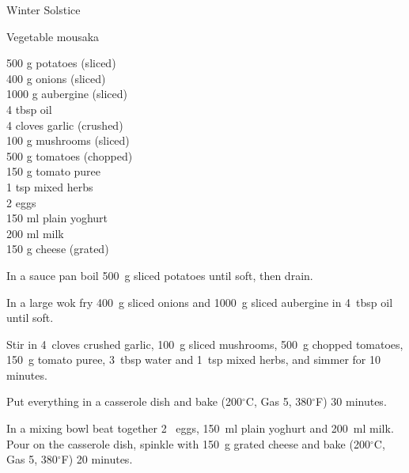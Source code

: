 \begin{menu}{Winter Solstice}
    \begin{recipe}{2}{Vegetable mousaka}%
    
		\begin{ingredients}
		500 g potatoes (sliced) \\
	400 g onions (sliced) \\
	1000 g aubergine (sliced) \\
	4 tbsp oil  \\
	4 cloves garlic (crushed) \\
	100 g mushrooms (sliced) \\
	500 g tomatoes (chopped) \\
	150 g tomato puree  \\
	1 tsp mixed herbs  \\
	2  eggs  \\
	150 ml plain yoghurt  \\
	200 ml milk  \\
	150 g cheese (grated) \\
	
		\end{ingredients}
	
    \begin{instructions}
    \item 
        In a sauce pan boil
        500~g sliced potatoes
        until soft,
        then drain.
      \item 
        In a large wok fry
        400~g sliced onions
        and
        1000~g sliced aubergine
        in
        4~tbsp  oil
        until soft.
      \item 
        Stir in
        4~cloves crushed garlic,
        100~g sliced mushrooms,
        500~g chopped tomatoes,
        150~g  tomato puree,
        3~tbsp  water
        and
        1~tsp  mixed herbs,
        and simmer for 10 minutes.
      \item 
        Put everything in a casserole dish
        and bake 
      (200$^{\circ}$C, Gas 5, 380$^{\circ}$F)
     30 minutes.
      \item 
        In a mixing bowl beat together
        2~  eggs,
        150~ml  plain yoghurt
        and
        200~ml  milk.
        Pour on the casserole dish, spinkle with
        150~g grated cheese
        and bake 
      (200$^{\circ}$C, Gas 5, 380$^{\circ}$F)
     20 minutes.
      
    \end{instructions}
    \end{recipe}%
  

\end{menu}
